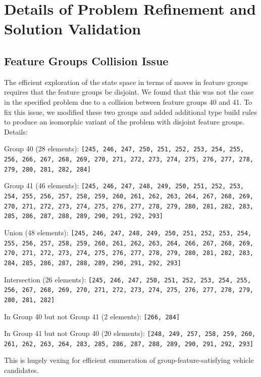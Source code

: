 \documentclass[aps,pra,twocolumn,superscriptaddress,groupedaddress]{revtex4}  %
\begin{document}



\appendix
\newpage
\clearpage

\section{Details of Problem Refinement and Solution Validation}

\subsection{Feature Groups Collision Issue}

The efficient exploration of the state space in terms of moves in feature groups
requires that the feature groups be disjoint. We found that this was not the
case in the specified problem due to a collision between feature groups 40 and
41. To fix this issue, we modified these two groups and added additional type
build rules to produce an isomorphic variant of the problem with disjoint
feature groups. Details:

Group 40 (28 elements): \texttt{[245, 246, 247, 250, 251, 252, 253, 254, 255,
256, 266, 267, 268, 269, 270, 271, 272, 273, 274, 275, 276, 277, 278, 279, 280,
281, 282, 284]}

Group 41 (46 elements): \texttt{[245, 246, 247, 248, 249, 250, 251, 252, 253,
254, 255, 256, 257, 258, 259, 260, 261, 262, 263, 264, 267, 268, 269, 270, 271,
272, 273, 274, 275, 276, 277, 278, 279, 280, 281, 282, 283, 285, 286, 287, 288,
289, 290, 291, 292, 293]}

Union (48 elements): \texttt{[245, 246, 247, 248, 249, 250, 251, 252, 253, 254,
255, 256, 257, 258, 259, 260, 261, 262, 263, 264, 266, 267, 268, 269, 270, 271,
272, 273, 274, 275, 276, 277, 278, 279, 280, 281, 282, 283, 284, 285, 286, 287,
288, 289, 290, 291, 292, 293]}

Intersection (26 elements): \texttt{[245, 246, 247, 250, 251, 252, 253, 254,
255, 256, 267, 268, 269, 270, 271, 272, 273, 274, 275, 276, 277, 278, 279, 280,
281, 282]}

In Group 40 but not Group 41 (2 elements): \texttt{[266, 284]}

In Group 41 but not Group 40 (20 elements): \texttt{[248, 249, 257, 258, 259,
260, 261, 262, 263, 264, 283, 285, 286, 287, 288, 289, 290, 291, 292, 293]}

This is hugely vexing for efficient enumeration of group-feature-satisfying
vehicle candidates.
\end{document}

